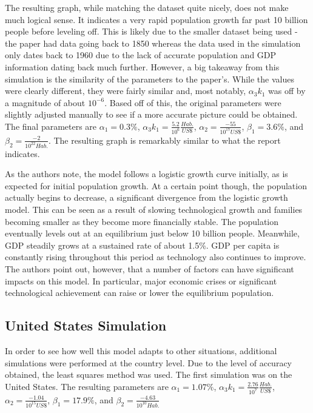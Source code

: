\documentclass[a4paper]{article}
\begin{document}
The resulting graph, while matching the dataset quite nicely, does not make much logical sense. It indicates a very rapid population growth far past 10 billion people before leveling off. This is likely due to the smaller dataset being used - the paper had data going back to 1850 whereas the data used in the simulation only dates back to 1960 due to the lack of accurate population and GDP information dating back much further. However, a big takeaway from this simulation is the similarity of the parameters to the paper's. While the values were clearly different, they were fairly similar and, most notably, $\alpha_3 k_1$ was off by a magnitude of about $10^{-6}$. Based off of this, the original parameters were slightly adjusted manually to see if a more accurate picture could be obtained. The final parameters are $\alpha_1 = 0.3\%$, $\alpha_3 k_1 = \frac{5.2}{10^{6}}\frac{Hab.}{US \$}$, $\alpha_2 = \frac{-55}{10^{17} US\$}$, $\beta_1 = 3.6\%$, and $\beta_2 = \frac{-2}{10^{22} Hab.}$. The resulting graph is remarkably similar to what the report indicates. 

As the authors note, the model follows a logistic growth curve initially, as is expected for initial population growth. At a certain point though, the population actually begins to decrease, a significant divergence from the logistic growth model. This can be seen as a result of slowing technological growth and families becoming smaller as they become more financially stable. The population eventually levels out at an equilibrium just below 10 billion people. Meanwhile, GDP steadily grows at a sustained rate of about 1.5\%. GDP per capita is constantly rising throughout this period as technology also continues to improve. The authors point out, however, that a number of factors can have significant impacts on this model. In particular, major economic crises or significant technological achievement can raise or lower the equilibrium population. 

\subsection{United States Simulation}

In order to see how well this model adapts to other situations, additional simulations were performed at the country level. Due to the level of accuracy obtained, the least squares method was used. The first simulation was on the United States. The resulting parameters are $\alpha_1 = 1.07\%$, $\alpha_3 k_1 = \frac{2.76}{10^{7}}\frac{Hab.}{US \$}$, $\alpha_2 = \frac{-1.04}{10^{15} US\$}$, $\beta_1 = 17.9\%$, and $\beta_2 = \frac{-4.63}{10^{10} Hab.}$ 
\end{document}
